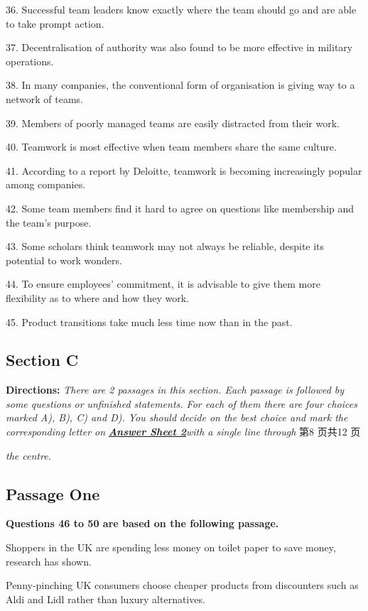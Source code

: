 \documentclass[UTF8,11pt]{ctexart}
\begin{document}
36. Successful team leaders know exactly where the team should go and are able to take prompt action.


37. Decentralisation of authority was also found to be more effective in military operations.


38. In many companies, the conventional form of organisation is giving way to a network of teams.


39. Members of poorly managed teams are easily distracted from their work.


40. Teamwork is most effective when team members share the same culture.


41. According to a report by Deloitte, teamwork is becoming increasingly popular among companies.


42. Some team members find it hard to agree on questions like membership and the team’s purpose.


43. Some scholars think teamwork may not always be reliable, despite its potential to work wonders.


44. To ensure employees’ commitment, it is advisable to give them more flexibility as to where and how they work.


45. Product transitions take much less time now than in the past.


\subsection*{\textbf{Section C}}


\textbf{Directions:}\textit{ There are 2 passages in this section. Each passage is followed by some questions or} \textit{unfinished statements. For each of them there are four choices marked A), B), C) and D). You should} \textit{decide on the best choice and mark the corresponding letter on}\textbf{\textit{ }}\textbf{\textit{\uline{Answer Sheet 2}}}\textit{with a single line through} 第8 页共12 页


\textit{the centre.}


\subsection*{\textbf{Passage One}}


\textbf{Questions 46 to 50 are based on the following passage.}


Shoppers in the UK are spending less money on toilet paper to save money, research has shown.


Penny-pinching UK consumers choose cheaper products from discounters such as Aldi and Lidl rather than luxury alternatives.
\end{document}
